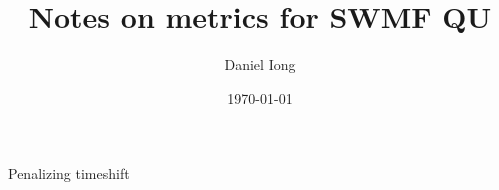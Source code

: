 \usepackage[utf8]{inputenc}
\usepackage[T1]{fontenc}
\usepackage{graphicx}
\usepackage{grffile}
\usepackage{longtable}
\usepackage{wrapfig}
\usepackage{rotating}
\usepackage[normalem]{ulem}
\usepackage{amsmath}
\usepackage{textcomp}
\usepackage{amssymb}
\usepackage{capt-of}
\usepackage{hyperref}
\author{Daniel Iong}
\date{\today}
\title{Notes on metrics for SWMF QU}


\maketitle

\begin{frame}[label={sec:org61edbff}]{Penalizing timeshift}
\end{frame}

